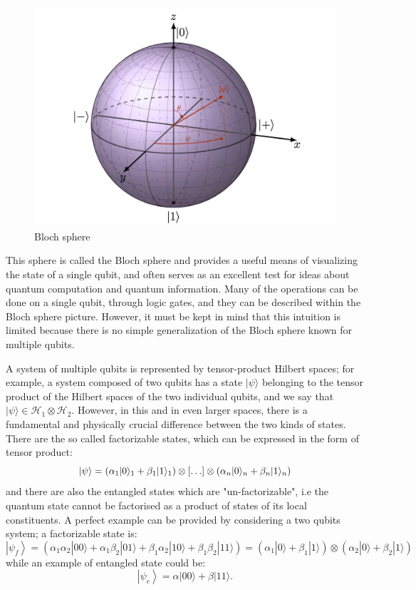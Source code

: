 \begin{figure}[h!]
    \centering
    \includegraphics[scale=0.25]{Mainmatter/images/blochhh.jpg}
    \caption{Bloch sphere}
    \label{sphere:bloch}
\end{figure}
This sphere is called the Bloch sphere and provides a useful means of visualizing the state of a single qubit, and often serves as an excellent test for ideas about quantum computation and quantum information.
Many of the operations can be done on a single qubit, through logic gates, and they can be described within the Bloch sphere picture.
However, it must be kept in mind that this intuition is limited because there is no simple generalization of the Bloch sphere known for multiple qubits.

A system of multiple qubits is represented by tensor-product Hilbert spaces; for example, a system composed of two qubits has a state
$|\psi\rangle$ belonging to the tensor product of the Hilbert spaces of the two individual qubits, and we say that $|\psi\rangle \in \mathcal{H}_1 \otimes \mathcal{H}_2$. However, in this and in even larger spaces, there is a fundamental and physically crucial difference between the two kinds of states. There are the so called factorizable states, which can be expressed in the form of tensor product: 
\begin{equation*}
    \ket{\psi} = \left(\alpha_{1}|0\rangle_{1}+\beta_{1}|1\rangle_{1}\right) \otimes[\ldots] \otimes\left(\alpha_{n}|0\rangle_{n}+\beta_{n}|1\rangle_{n}\right)
\end{equation*}
and there are also the  entangled states which are "un-factorizable", i.e the quantum state cannot be factorised as a product of states of its local constituents. 
A perfect example can be provided by considering a two qubits system; a factorizable state is: 
$$
\left|\psi_{f}\right\rangle=(\alpha_1\alpha_2|00\rangle+\alpha_1\beta_2|01\rangle+\beta_1\alpha_2|10\rangle+\beta_1\beta_2|11\rangle)=(\alpha_1|0\rangle+\beta_1|1\rangle) \otimes(\alpha_2|0\rangle+\beta_2|1\rangle)
$$
while an example of entangled state could be:
$$
\left|\psi_{e}\right\rangle=\alpha|00\rangle+\beta|11\rangle.
$$


